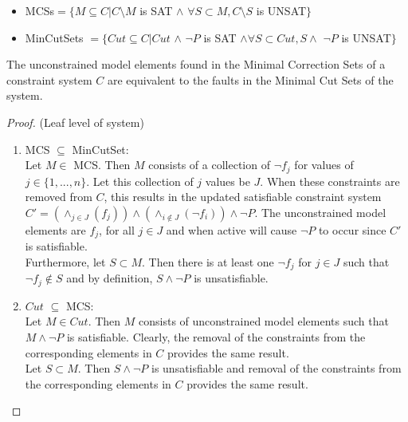 \begin{itemize}
\item MCSs$ = \{ M \subseteq C |  C\setminus M$ is SAT $\land$ $ \forall S \subset M, C \setminus S$ is UNSAT$\}$ 
\item MinCutSets $ = \{ Cut \subseteq C | Cut $ $\land$ $ \neg P $ is SAT $\land \forall S \subset Cut, S \land$ $ \neg P$ is UNSAT$ \}$
\end{itemize}

\begin{theorem} The unconstrained model elements found in the Minimal Correction Sets of a constraint system $C$ are equivalent to the faults in the Minimal Cut Sets of the system.

\begin{proof} (Leaf level of system)
\begin{enumerate}[label=(\roman*)]

\item MCS $\subseteq$ MinCutSet: \\

Let $M \in $ MCS. Then $M$ consists of a collection of $\neg f_j$ for values of $j \in \{1,...,n\}$. Let this collection of $j$ values be $J$. When these constraints are removed from $C$, this results in the updated satisfiable constraint system $C' = (\wedge_{j \in J}(f_j)) \land (\wedge_{i \notin J}(\neg f_i)) \land \neg P$. The unconstrained model elements are $f_j$, for all $j \in J$ and when active will cause $\neg P$ to occur since $C'$ is satisfiable.\\

Furthermore, let $S \subset M$. Then there is at least one $\neg f_j$ for $j \in J$ such that $\neg f_j \notin S$ and by definition, $S \land \neg P$ is unsatisfiable. \\

\item $Cut $ $\subseteq$ MCS: \\

Let $M \in Cut$. Then $M$ consists of unconstrained model elements such that $M \land \neg P$ is satisfiable. Clearly, the removal of the constraints from the corresponding elements in $C$ provides the same result. \\

Let $S \subset M$. Then $S \land \neg P$ is unsatisfiable and removal of the constraints from the corresponding elements in $C$ provides the same result. \\
\end{enumerate}
\end{proof}
\end{theorem}

